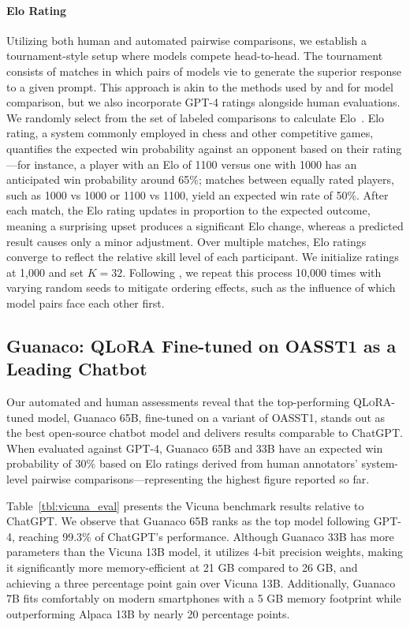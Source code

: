 \paragraph{Elo Rating} Utilizing both human and automated pairwise comparisons, we establish a tournament-style setup where models compete head-to-head. The tournament consists of matches in which pairs of models vie to generate the superior response to a given prompt. This approach is akin to the methods used by \citet{bai2022training} and \citet{vicuna2023} for model comparison, but we also incorporate GPT-4 ratings alongside human evaluations. We randomly select from the set of labeled comparisons to calculate Elo~\citep{elo1967proposed,elo1978rating}. Elo rating, a system commonly employed in chess and other competitive games, quantifies the expected win probability against an opponent based on their rating—for instance, a player with an Elo of 1100 versus one with 1000 has an anticipated win probability around 65\%; matches between equally rated players, such as 1000 vs 1000 or 1100 vs 1100, yield an expected win rate of 50\%. After each match, the Elo rating updates in proportion to the expected outcome, meaning a surprising upset produces a significant Elo change, whereas a predicted result causes only a minor adjustment. Over multiple matches, Elo ratings converge to reflect the relative skill level of each participant. We initialize ratings at 1,000 and set $K=32$. Following \citet{vicuna2023}, we repeat this process 10,000 times with varying random seeds to mitigate ordering effects, such as the influence of which model pairs face each other first.

\subsection{\textbf{Guanaco}: \textsc{QLoRA} Fine-tuned on OASST1 as a Leading Chatbot} Our automated and human assessments reveal that the top-performing \textsc{QLoRA}-tuned model, {Guanaco} 65B, fine-tuned on a variant of OASST1, stands out as the best open-source chatbot model and delivers results comparable to ChatGPT. When evaluated against GPT-4, {Guanaco} 65B and 33B have an expected win probability of 30\% based on Elo ratings derived from human annotators’ system-level pairwise comparisons—representing the highest figure reported so far.

Table~\ref{tbl:vicuna_eval} presents the Vicuna benchmark \cite{vicuna2023} results relative to ChatGPT. We observe that {Guanaco} 65B ranks as the top model following GPT-4, reaching 99.3\% of ChatGPT’s performance. Although {Guanaco} 33B has more parameters than the Vicuna 13B model, it utilizes 4-bit precision weights, making it significantly more memory-efficient at 21 GB compared to 26 GB, and achieving a three percentage point gain over Vicuna 13B. Additionally, {Guanaco} 7B fits comfortably on modern smartphones with a 5 GB memory footprint while outperforming Alpaca 13B by nearly 20 percentage points.

